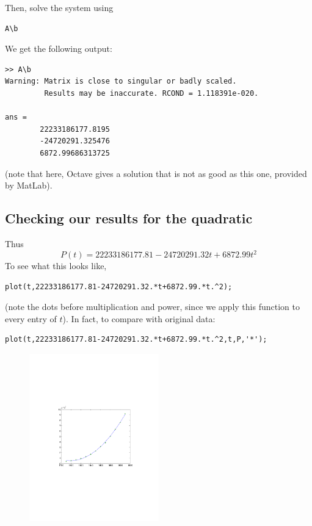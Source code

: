 Then, solve the system using
\begin{verbatim}
A\b
\end{verbatim}
We get the following output:
\begin{verbatim}
>> A\b
Warning: Matrix is close to singular or badly scaled.
         Results may be inaccurate. RCOND = 1.118391e-020.

ans =
        22233186177.8195
        -24720291.325476
        6872.99686313725
\end{verbatim}
(note that here, Octave gives a solution that is not as good as this one, provided by MatLab).


\subsection{Checking our results for the quadratic}
Thus
\[
P(t)=22233186177.81-24720291.32t+6872.99t^2
\]
To see what this looks like,
\begin{verbatim}
plot(t,22233186177.81-24720291.32.*t+6872.99.*t.^2);
\end{verbatim}
(note the dots before multiplication and power, since we apply this function to every entry of $t$).
In fact, to compare with original data:
\begin{verbatim}
plot(t,22233186177.81-24720291.32.*t+6872.99.*t.^2,t,P,'*');
\end{verbatim}
\begin{figure}[htbp]
\begin{center}
\includegraphics[width=0.5\textwidth]
{../figs_02_population_growth/quadratic_fit}
\end{center}
\end{figure}




